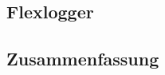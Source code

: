\begin{spacing}{1}
	\chapter{Flexlogger}\label{chapter:flexlogger}
	\end{spacing}
	

	


\begin{spacing}{1}
\chapter{Zusammenfassung}
\end{spacing}


\newpage
{}
\setcounter{page}{\value{RPages}}

\glsnogroupskiptrue
\printglossary[title=Glossar,toctitle=Glossar] %
\listoffigures
\listoftables
\lstlistoflistings
\appendix
{}




